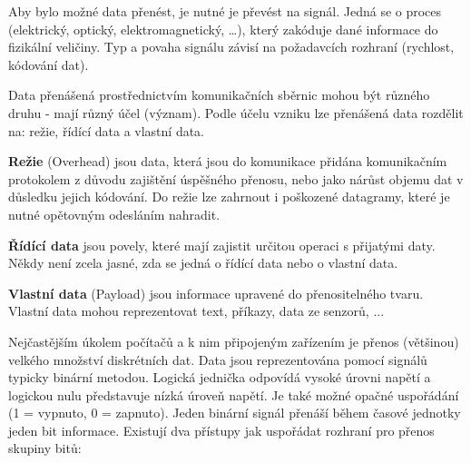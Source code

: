 Aby bylo možné data přenést, je nutné je převést na signál. Jedná se o proces (elektrický, optický, elektromagnetický, …), který zakóduje dané informace do fizikální veličiny. Typ a povaha signálu závisí na požadavcích rozhraní (rychlost, kódování dat).

 
Data přenášená prostřednictvím komunikačních sběrnic mohou být různého druhu - mají různý účel (význam). Podle účelu vzniku lze přenášená data rozdělit na: režie, řídící data a vlastní data.

{\bf Režie} (Overhead) jsou data, která jsou do komunikace přidána komunikačním protokolem z důvodu zajištění úspěšného přenosu, nebo jako nárůst objemu dat v důsledku jejich kódování. Do režie lze zahrnout i poškozené datagramy, které je nutné opětovným odesláním nahradit.

{\bf Řídící data} jsou povely, které mají zajistit určitou operaci s přijatými daty. Někdy není zcela jasné, zda se jedná o řídící data nebo o vlastní data.

{\bf Vlastní data} (Payload) jsou informace upravené do přenositelného tvaru. Vlastní data mohou reprezentovat text, příkazy, data ze senzorů, ...


Nejčastějším úkolem počítačů a k nim připojeným zařízením je přenos (většinou) velkého množství diskrétních dat. Data jsou reprezentována pomocí signálů typicky binární metodou. Logická jednička odpovídá vysoké úrovni napětí a logickou nulu představuje nízká úroveň napětí. Je také možné opačné uspořádání (1 = vypnuto, 0 = zapnuto). Jeden binární signál přenáší během časové jednotky jeden bit informace. Existují dva přístupy jak uspořádat rozhraní pro přenos skupiny bitů:

\vskip 4mm
\vskip 4mm


